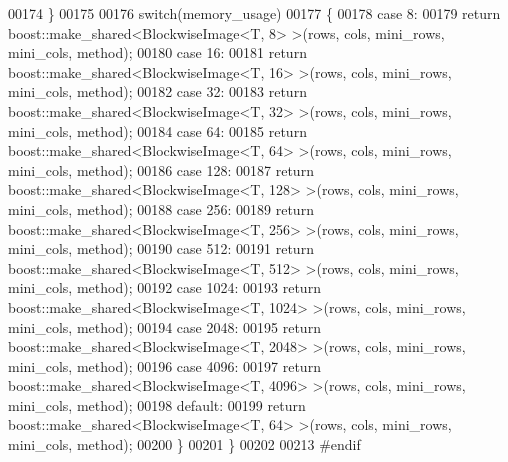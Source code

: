 \begin{DoxyCode}
00174         \}
00175 
00176         \textcolor{keywordflow}{switch}(memory\_usage)
00177         \{
00178         \textcolor{keywordflow}{case} 8:
00179                 \textcolor{keywordflow}{return} boost::make\_shared<BlockwiseImage<T, 8> >(rows, cols, 
      mini\_rows, mini\_cols, method);
00180         \textcolor{keywordflow}{case} 16:
00181                 \textcolor{keywordflow}{return} boost::make\_shared<BlockwiseImage<T, 16> >(rows, cols, 
      mini\_rows, mini\_cols, method);
00182         \textcolor{keywordflow}{case} 32:
00183                 \textcolor{keywordflow}{return} boost::make\_shared<BlockwiseImage<T, 32> >(rows, cols, 
      mini\_rows, mini\_cols, method);
00184         \textcolor{keywordflow}{case} 64:
00185                 \textcolor{keywordflow}{return} boost::make\_shared<BlockwiseImage<T, 64> >(rows, cols, 
      mini\_rows, mini\_cols, method);
00186         \textcolor{keywordflow}{case} 128:
00187                 \textcolor{keywordflow}{return} boost::make\_shared<BlockwiseImage<T, 128> >(rows, cols, 
      mini\_rows, mini\_cols, method);
00188         \textcolor{keywordflow}{case} 256:
00189                 \textcolor{keywordflow}{return} boost::make\_shared<BlockwiseImage<T, 256> >(rows, cols, 
      mini\_rows, mini\_cols, method);
00190         \textcolor{keywordflow}{case} 512:
00191                 \textcolor{keywordflow}{return} boost::make\_shared<BlockwiseImage<T, 512> >(rows, cols, 
      mini\_rows, mini\_cols, method);
00192         \textcolor{keywordflow}{case} 1024:
00193                 \textcolor{keywordflow}{return} boost::make\_shared<BlockwiseImage<T, 1024> >(rows, cols,
       mini\_rows, mini\_cols, method);
00194         \textcolor{keywordflow}{case} 2048:
00195                 \textcolor{keywordflow}{return} boost::make\_shared<BlockwiseImage<T, 2048> >(rows, cols,
       mini\_rows, mini\_cols, method);
00196         \textcolor{keywordflow}{case} 4096:
00197                 \textcolor{keywordflow}{return} boost::make\_shared<BlockwiseImage<T, 4096> >(rows, cols,
       mini\_rows, mini\_cols, method);
00198         \textcolor{keywordflow}{default}:
00199                 \textcolor{keywordflow}{return} boost::make\_shared<BlockwiseImage<T, 64> >(rows, cols, 
      mini\_rows, mini\_cols, method);
00200         \}
00201 \}
00202 
00213 \textcolor{preprocessor}{#endif}
\end{DoxyCode}
